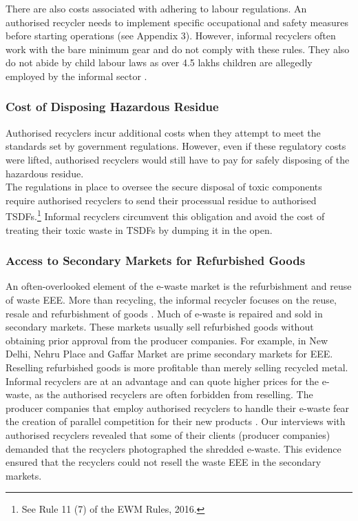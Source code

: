 \documentclass[a4paper, 12pt]{article}
\begin{document}
                    There are also costs associated with adhering to labour regulations. An authorised recycler needs to implement specific occupational and safety measures before starting operations (see Appendix 3). However, informal recyclers often work with the bare minimum gear and do not comply with these rules. They also do not abide by child labour laws as over 4.5 lakhs children are allegedly employed by the informal sector \parencite{assochamchild}.
                    
\subsubsection{Cost of Disposing Hazardous Residue }
                    
                    Authorised recyclers incur additional costs when they attempt to meet the standards set by government regulations. However, even if these regulatory costs were lifted, authorised recyclers would still have to pay for safely disposing of the hazardous residue.\\
                     
                     The regulations in place to oversee the secure disposal of toxic components require authorised recyclers to send their processual residue to authorised TSDFs.\footnote{See Rule 11 (7) of the EWM Rules, 2016.} Informal recyclers circumvent this obligation and avoid the cost of treating their toxic waste in TSDFs by dumping it in the open.
                    
\subsubsection{Access to Secondary Markets for Refurbished Goods}
                    
                    An often-overlooked element of the e-waste market is the refurbishment and reuse of waste EEE. More than recycling, the informal recycler focuses on the reuse, resale and refurbishment of goods \parencite{gidwanicorwinpaper}. Much of e-waste is repaired and sold in secondary markets. These markets usually sell refurbished goods without obtaining prior approval from the producer companies. For example, in New Delhi, Nehru Place and Gaffar Market are prime secondary markets for EEE.\\
                    
                    Reselling refurbished goods is more profitable than merely selling recycled metal. Informal recyclers are at an advantage and can quote higher prices for the e-waste, as the authorised recyclers are often forbidden from reselling. The producer companies that employ authorised recyclers to handle their e-waste fear the creation of parallel competition for their new products \parencite{alevphd}. Our interviews with authorised recyclers revealed that some of their clients (producer companies) demanded that the recyclers photographed the shredded e-waste. This evidence ensured that the recyclers could not resell the waste EEE in the secondary markets.\\
                    
\end{document}
